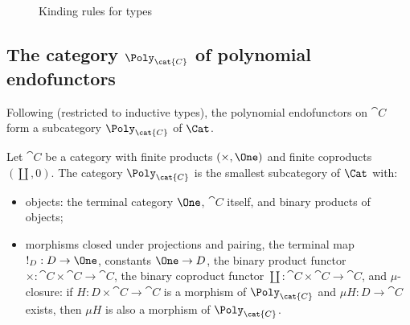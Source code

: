 \begin{figure}
\caption{Kinding rules for types}
\label{fig:polynomial-types:kinding}
\end{figure}

\subsection{The category $\Poly_{\cat{C}}$ of polynomial endofunctors}
\label{sec:polynomial-types:poly}

Following \citet[Definition~6]{nunes2023} (restricted to inductive types), the polynomial
endofunctors on $\cat{C}$ form a subcategory $\Poly_{\cat{C}}$ of $\Cat$.

\begin{definition}
\label{def:polynomial-types:Poly}
Let $\cat{C}$ be a category with finite products $(\times, \One)$ and finite coproducts
$(\coprod, 0)$. The category $\Poly_{\cat{C}}$ is the smallest subcategory of $\Cat$ with:
\begin{itemize}
\item objects: the terminal category $\One$, $\cat{C}$ itself, and binary products of objects;
\item morphisms closed under projections and pairing, the terminal map $!_D : D \to \One$,
  constants $\One \to D$, the binary product functor $\times : \cat{C} \times \cat{C} \to \cat{C}$,
  the binary coproduct functor $\coprod : \cat{C} \times \cat{C} \to \cat{C}$, and
  $\mu$-closure: if $H : D \times \cat{C} \to \cat{C}$ is a morphism of $\Poly_{\cat{C}}$ and
  $\mu H : D \to \cat{C}$ exists, then $\mu H$ is also a morphism of $\Poly_{\cat{C}}$.
\end{itemize}
\end{definition}


